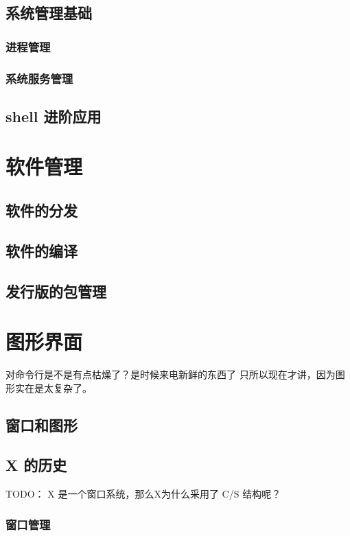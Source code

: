 \documentclass[amstex,twoside]{ctexbook}
\begin{document}
\section{系统管理基础}

\subsection{进程管理	}
\subsection{系统服务管理	}

\section{shell 进阶应用}

\chapter{软件管理}\label{软件管理}

\section{软件的分发}
\section{软件的编译}
\section{发行版的包管理}\label{section:pkgmgr}
	
\chapter{图形界面}
对命令行是不是有点枯燥了？是时候来电新鲜的东西了 只所以现在才讲，因为图形实在是太复杂了。

\section{窗口和图形}

\section{X 的历史}

TODO： X 是一个窗口系统，那么X为什么采用了 C/S 结构呢？
\subsection{ 窗口管理}
\end{document}
